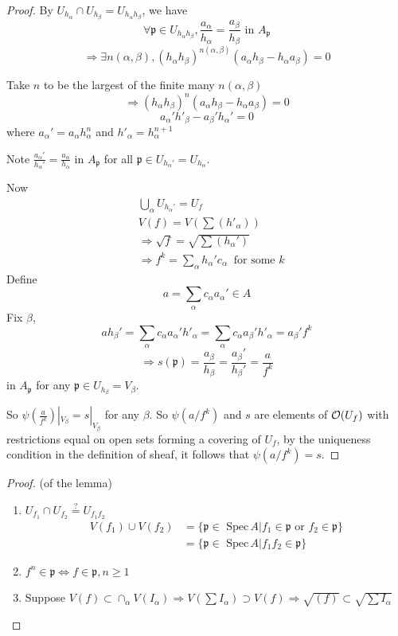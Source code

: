 \documentclass[11pt]{article}
\theoremstyle{definition}
\newcommand{\spec}{\text{ Spec}\,}
\newcommand{\scp}{{\mathfrak p}}
\newcommand{\calo}{{\cal O}}
\newcommand{\Lrta}{\Longrightarrow}
\newcommand{\Llrta}{\Longleftrightarrow}
\begin{document}
\begin{proof}
By $U_{h_\alpha}\cap U_{h_\beta}=U_{h_\alpha h_\beta}$, we have
$$
\forall \scp \in U_{h_\alpha h_\beta}, \frac{a_\alpha}{h_\alpha}=\frac{a_\beta}{h_\beta}\text{  in } A_\scp
$$
$$
\Lrta \exists n(\alpha, \beta), (h_\alpha h_\beta)^{n(\alpha, \beta)}(a_\alpha h_\beta-h_\alpha a_\beta)=0
$$

Take $n$ to be the largest of the finite many $n(\alpha,\beta)$
$$
\Lrta(h_\alpha h_\beta)^{n}(a_\alpha h_\beta-h_\alpha a_\beta)=0
$$
$$
a_\alpha' h'_\beta-a_\beta' h_\alpha'=0
$$
where $a_\alpha'=a_\alpha h_\alpha^n$ and $h'_\alpha=h_{\alpha}^{n+1}$

Note 
$\frac{a_\alpha'}{h_\alpha'}=\frac{a_\alpha}{h_\alpha}$ in $A_\scp$ for all $\scp\in U_{h_\alpha'}=U_{h_\alpha}$.

Now
$$
\begin{aligned}
& \bigcup_\alpha U_{h_\alpha'}=U_f\\
& V(f)=V(\sum (h'_\alpha))\\
&\Lrta \sqrt{f}=\sqrt{\sum(h_\alpha')}\\
& \Lrta f^k =\sum_\alpha h_\alpha' c_\alpha\ \text{ for some } k
\end{aligned}
$$
Define 
$$
a=\sum_\alpha c_\alpha a_\alpha'\in A
$$
Fix $\beta$,
$$
a h_\beta'=\sum_\alpha c_\alpha a_\alpha' h'_\alpha=\sum_\alpha c_\alpha a_\beta' h'_\alpha
=a_\beta' f^k
$$
$$
\Lrta s(\scp)=\frac{a_\beta}{h_\beta}= \frac{a_\beta'}{h_\beta'}=\frac{a
}{f^k}
$$
in $A_\scp $ for any $\scp \in U_{h_\beta}=V_\beta$.

So $\psi(\frac{a}{f^k})|_{V_\beta}=s|_{V_\beta}$ for any $\beta$.
So $\psi(a/f^k)$ and $s$ are elements of $\calo(U_f)$ with restrictions equal on open sets forming a covering of $U_f$, by the uniqueness condition in the definition of sheaf, it follows that $\psi(a/f^k)=s$.
\end{proof}


\begin{proof}(of the lemma)
\begin{enumerate}[label=(\arabic*)]
\item $U_{f_1}\cap U_{f_2}\overset{?}{=}U_{f_1 f_2}$
$$
\begin{aligned}
V(f_1)\cup V(f_2)&=\{\scp\in \spec A|f_1\in \scp \text{ or } f_2\in\scp \}\\
&=\{\scp\in\spec A|f_1f_2\in \scp\}
\end{aligned}
$$
\item $f^n\in \scp \Llrta f\in\scp, n\geq1$
\item Suppose $V(f)\subset \cap_\alpha V(I_\alpha)\Lrta V(\sum I_\alpha)\supset V(f)\Lrta \sqrt{(f)}\subset \sqrt{\sum I_\alpha}$
\end{enumerate}
\end{proof}
\end{document}
